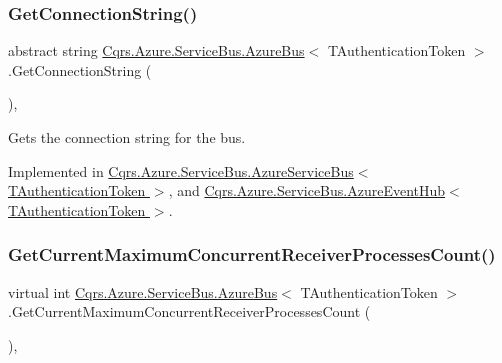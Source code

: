 \subsubsection{\texorpdfstring{Get\+Connection\+String()}{GetConnectionString()}}
{\footnotesize\ttfamily abstract string \hyperlink{classCqrs_1_1Azure_1_1ServiceBus_1_1AzureBus}{Cqrs.\+Azure.\+Service\+Bus.\+Azure\+Bus}$<$ T\+Authentication\+Token $>$.Get\+Connection\+String (\begin{DoxyParamCaption}{ }\end{DoxyParamCaption})\hspace{0.3cm}{\ttfamily [protected]}, {}}



Gets the connection string for the bus. 



Implemented in \hyperlink{classCqrs_1_1Azure_1_1ServiceBus_1_1AzureServiceBus_a5a3b3610dc5dfebe586262c0bc787748_a5a3b3610dc5dfebe586262c0bc787748}{Cqrs.\+Azure.\+Service\+Bus.\+Azure\+Service\+Bus$<$ T\+Authentication\+Token $>$}, and \hyperlink{classCqrs_1_1Azure_1_1ServiceBus_1_1AzureEventHub_a9855633b53ed1f67863ef9dffad0812c_a9855633b53ed1f67863ef9dffad0812c}{Cqrs.\+Azure.\+Service\+Bus.\+Azure\+Event\+Hub$<$ T\+Authentication\+Token $>$}.

\mbox{\label{classCqrs_1_1Azure_1_1ServiceBus_1_1AzureBus_adfed2926ff68eff521e8c64c02cca2a6_adfed2926ff68eff521e8c64c02cca2a6}} 
\subsubsection{\texorpdfstring{Get\+Current\+Maximum\+Concurrent\+Receiver\+Processes\+Count()}{GetCurrentMaximumConcurrentReceiverProcessesCount()}}
{\footnotesize\ttfamily virtual int \hyperlink{classCqrs_1_1Azure_1_1ServiceBus_1_1AzureBus}{Cqrs.\+Azure.\+Service\+Bus.\+Azure\+Bus}$<$ T\+Authentication\+Token $>$.Get\+Current\+Maximum\+Concurrent\+Receiver\+Processes\+Count (\begin{DoxyParamCaption}{ }\end{DoxyParamCaption})\hspace{0.3cm}{\ttfamily [protected]}, {\ttfamily [virtual]}}



